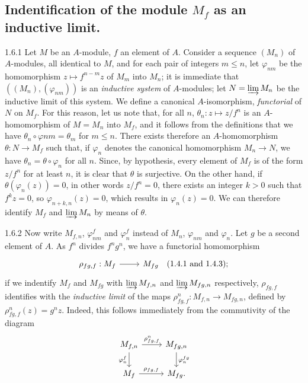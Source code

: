\documentclass[../main.tex]{subfiles}
\begin{document}
\subsection{Indentification of the module $M_f$ as an inductive limit.}

\begin{cx}{1.6.1}
Let $M$ be an $A$-module, $f$ an element of $A$. Consider a sequence
$(M_n)$ of $A$-modules, all identical to $M$, and for each pair of integers
$m\leq n$, let $\varphi_{nm}$ be the homomorphism $z\mapsto f^{n-m}z$ of $M_m$
into $M_n$; it is immediate that $((M_n),(\varphi_{nm}))$ is an \emph{inductive system}
of $A$-modules; let $N=\varinjlim M_n$ be the inductive limit of this system. We define
a canonical $A$-isomorphism, \emph{functorial} of $N$ on $M_f$. For this reason, let us
note that, for all $n$, $\theta_n:z\mapsto z/f^n$ is an $A$-homomorphism of $M=M_n$ into
$M_f$, and it follows from the definitions that we have $\theta_n\circ\varphi{nm}=\theta_m$
for $m\leq n$. There exists therefore an $A$-homomorphism $\theta:N\to M_f$ such that, if
$\varphi_n$ denotes the canonical homomorphism $M_n\to N$, we have $\theta_n=\theta\circ\varphi_n$
for all $n$. Since, by hypothesis, every element of $M_f$ is of the form $z/f^n$ for at least $n$,
it is clear that $\theta$ is surjective. On the other hand, if $\theta(\varphi_n(z))=0$,
in other words $z/f^n=0$, there exists an integer $k>0$ such that $f^k z=0$, so $\varphi_{n+k,n}(z)=0$,
which results in $\varphi_n(z)=0$. We can therefore identify $M_f$ and $\varinjlim M_n$ by means
of $\theta$.
\end{cx}

\begin{cx}{1.6.2}
Now write $M_{f,n}$, $\varphi_{nm}^f$ and $\varphi_n^f$ instead of $M_n$, $\varphi_{nm}$ and
$\varphi_n$. Let $g$ be a second element of $A$. As $f^n$ divides $f^n g^n$, we have a functorial
homomorphism
\[\TI
  \rho_{fg,f}:M_f\ar[r] & M_{fg}\quad(1.4.1\text{ and }1.4.3);
\TE\]
if we indentify $M_f$ and $M_{fg}$ with $\varinjlim M_{f,n}$ and $\varinjlim M_{fg,n}$
respectively, $\rho_{fg,f}$ identifies with the \emph{inductive limit} of the maps
$\rho_{fg,f}^n:M_{f,n}\to M_{fg,n}$, defined by $\rho_{fg,f}^n(z)=g^n z$. Indeed, this follows
immediately from the commutivity of the diagram
\[\TI
  M_{f,n}\ar[r,"\rho_{fg,f}^n"]\ar[d,"\varphi_n^f"'] & M_{fg,n}\ar[d,"\varphi_n^{fg}"]\\
  M_f\ar[r,"\rho_{fg,f}"] & M_{fg}.
\TE\]
\end{cx}
\end{document}
